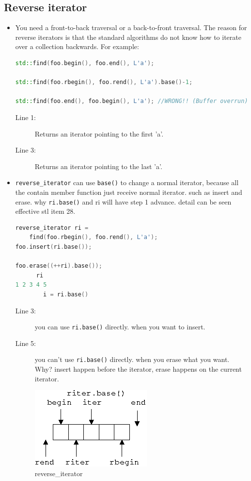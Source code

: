 \documentclass[a4paper,11pt,twoside]{book}
\begin{document}
\subsection{Reverse iterator}
\begin{itemize}
\item You need a front-to-back traversal or a back-to-front traversal. The reason for reverse iterators is that the standard algorithms do not know how to iterate over a collection backwards. For example:
\begin{lstlisting}[frame=single, language=c++]
std::find(foo.begin(), foo.end(), L'a');

std::find(foo.rbegin(), foo.rend(), L'a').base()-1;

std::find(foo.end(), foo.begin(), L'a'); //WRONG!! (Buffer overrun)
\end{lstlisting}
\begin{description}
	\item[Line 1:] Returns an iterator pointing to the first 'a'.
	\item[Line 3:] Returns an iterator pointing to the last 'a'.
\end{description}
\item \texttt{reverse\_iterator} can use \texttt{base()} to change a normal iterator, because all the contain member function just receive normal iterator. such as insert and erase.
why \texttt{ri.base()} and ri will have step 1 advance. detail can be seen effective stl item 28.
\begin{lstlisting}[frame=single, language=c++]
reverse_iterator ri =
    find(foo.rbegin(), foo.rend(), L'a');
foo.insert(ri.base()); 
                          
foo.erase((++ri).base()); 
      ri
1 2 3 4 5
        i = ri.base()
\end{lstlisting}
\begin{description}
	\item[Line 3:] you can use \texttt{ri.base()} directly. when you want to insert.
	\item[Line 5:] you can't use \texttt{ri.base()} directly. when you erase what you want. Why? insert happen before the iterator, erase happens on the current iterator. 
\end{description}

\begin{figure}
	\centering
	\includegraphics[width=0.3\linewidth]{pics/ri.png}
	\caption{reverse\_iterator }
	\label{fig:ri}
\end{figure}


\end{itemize}
\end{document}
